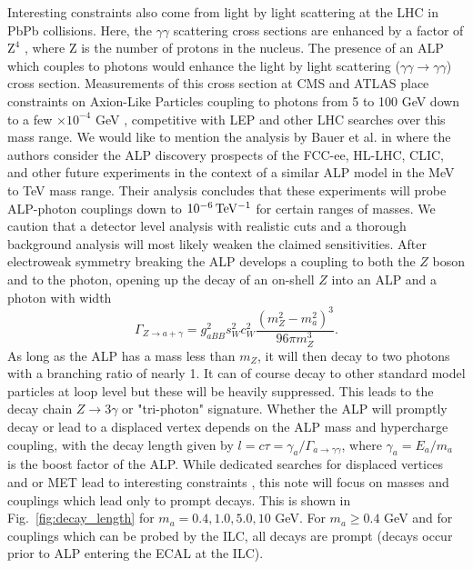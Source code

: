 \documentclass[aps,onecolumn,twoside,secnumarabic,12pt,balancelastpage,amsmath,amssymb,nofootinbib,hyperref=pdftex]{revtex4}
\begin{document}
\vskip 0.12in
Interesting constraints also come from light by light scattering at the LHC in PbPb collisions. Here, the $\gamma\gamma$ scattering cross sections are enhanced by a factor of $\text{Z}^{4}$ \cite{Knapen:2016moh}, where Z is the number of protons in the nucleus. The presence of an ALP which couples to photons would enhance the light by light scattering ($\gamma\gamma\rightarrow\gamma\gamma$) cross section. Measurements of this cross section at CMS and ATLAS place constraints on Axion-Like Particles coupling to photons from 5 to 100 GeV down to a few $\times10^{-4}$ GeV \cite{Sirunyan:2018fhl,Aad:2020cje,Knapen:2016moh}, competitive with LEP and other LHC searches over this mass range.
\vskip 0.12in
We would like to mention the analysis by Bauer et al. in \cite{Bauer:2018uxu} where the authors consider the ALP discovery prospects of the FCC-ee, HL-LHC, CLIC, and other future experiments in the context of a similar ALP model in the MeV to TeV mass range. Their analysis concludes that these experiments will probe ALP-photon couplings down to $10^{-6}\,\rm{TeV^{-1}}$ for certain ranges of masses. We caution that a detector level analysis with realistic cuts and a thorough background analysis will most likely weaken the claimed sensitivities.
\vskip 0.12in
After electroweak symmetry breaking the ALP develops a coupling to both the $Z$ boson and to the photon, opening up the decay of an on-shell $Z$ into an ALP and a photon with width
\begin{equation}
\Gamma_{Z\rightarrow a + \gamma} = g_{a BB}^2 s_{W}^{2}c_{W}^{2}\frac{(m_{Z}^{2} - m_{a}^{2})^3}{96\pi m_{Z}^3}.
\end{equation}
As long as the ALP has a mass less than $m_{Z}$, it will then decay to two photons with a branching ratio of nearly 1. It can of course decay to other standard model particles at loop level but these will be heavily suppressed. This leads to the decay chain $Z\rightarrow 3\gamma$ or "tri-photon" signature.
\vskip 0.12in
Whether the ALP will promptly decay or lead to a displaced vertex depends on the ALP mass and hypercharge coupling, with the decay length given by $l = c\tau = \gamma_{a}/\Gamma_{a \rightarrow \gamma\gamma}$, where $\gamma_{a} = E_{a}/m_{a}$ is the boost factor of the ALP. While dedicated searches for displaced vertices and or MET lead to interesting constraints \cite{Gershtein:2020mwi,Darme:2020sjf}, this note will focus on masses and couplings which lead only to prompt decays. This is shown in Fig.~\ref{fig:decay_length} for $m_{a} = 0.4, 1.0 , 5.0, 10$ GeV. For $m_{a} \geq 0.4$ GeV and for couplings which can be probed by the ILC, all decays are prompt (decays occur prior to ALP entering the ECAL at the ILC).
\end{document}
